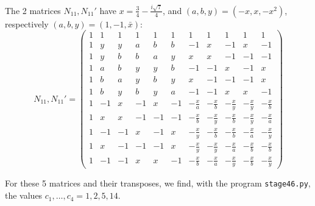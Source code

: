 \documentclass[11pt]{amsart}
\begin{document}
\noindent The 2 matrices $N_{11},N_{11}'$ have $x=\frac{3}{4}-\frac{i\sqrt7}{4}$, and $(a,b,y)=(-x,x,-x^2)$, respectively $(a,b,y)=(1,-1,\bar{x})$:
{\small\setlength{\arraycolsep}{3pt}$$N_{11},N_{11}'=\begin{pmatrix}
1&1&1&1&1&1&1&1&1&1&1\\
1&y&y&a&b&b&-1&x&-1&x&-1\\
1&y&b&b&a&y&x&x&-1&-1&-1\\
1&a&b&y&y&b&-1&-1&x&-1&x\\
1&b&a&y&b&y&x&-1&-1&-1&x\\
1&b&y&b&y&a&-1&-1&x&x&-1\\
1&-1&x&-1&x&-1&-\frac{x}{a}&-\frac{x}{b}&-\frac{x}{y}&-\frac{x}{y}&-\frac{x}{b}\\
1&x&x&-1&-1&-1&-\frac{x}{b}&-\frac{x}{y}&-\frac{x}{b}&-\frac{x}{y}&-\frac{x}{a}\\
1&-1&-1&x&-1&x&-\frac{x}{y}&-\frac{x}{b}&-\frac{x}{b}&-\frac{x}{a}&-\frac{x}{y}\\
1&x&-1&-1&-1&x&-\frac{x}{y}&-\frac{x}{y}&-\frac{x}{a}&-\frac{x}{b}&-\frac{x}{b}\\
1&-1&-1&x&x&-1&-\frac{x}{b}&-\frac{x}{a}&-\frac{x}{y}&-\frac{x}{b}&-\frac{x}{y}
\end{pmatrix}$$}

\noindent For these 5 matrices and their transposes, we find, with the program \texttt{stage46.py}, the values $c_1,\ldots,c_4=1,2,5,14$.
\end{document}
